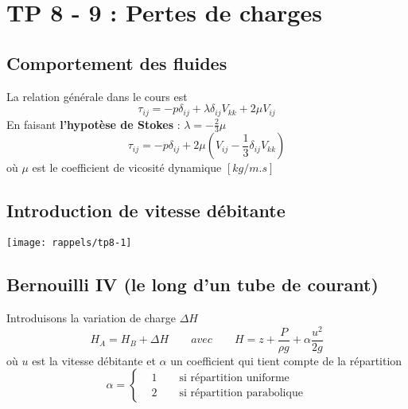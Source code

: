 
\section*{TP 8 - 9 : Pertes de charges}
\subsection*{Comportement des fluides}
La relation générale dans le cours est
\begin{equation}
	\tau _{ij} = -p\delta _{ij}+\lambda \delta _{ij} V_{kk} +2\mu V_{ij}
\end{equation}
En faisant \textbf{l'hypotèse de Stokes} : $\lambda = -\frac{2}{3}\mu$
\begin{equation}
	\tau _{ij} = -p\delta _{ij}+2\mu (V_{ij} -\frac{1}{3} \delta_{ij}V_{kk})
\end{equation}
où $\mu$ est le coefficient de vicosité dynamique $[kg/m.s]$

\subsection*{Introduction de vitesse débitante}
\begin{center}
	\texttt{[image: rappels/tp8-1]}
\end{center}

\subsection*{Bernouilli IV (le long d'un tube de courant)}
Introduisons la variation de charge $\Delta H$
\begin{equation}
	H_A = H_B + \Delta H \qquad avec \qquad H= z+\frac{P}{\rho g}+\alpha \frac{u^2}{2g}
\end{equation}
où $u$ est la vitesse débitante et $\alpha$ un coefficient qui tient compte de la répartition 
\begin{equation}
	\alpha = 
	\left\{
	\begin{aligned}
		  & 1 \qquad \mbox{si répartition uniforme}    \\
		  & 2 \qquad \mbox{si répartition parabolique} 
	\end{aligned}
	\right.
\end{equation}

